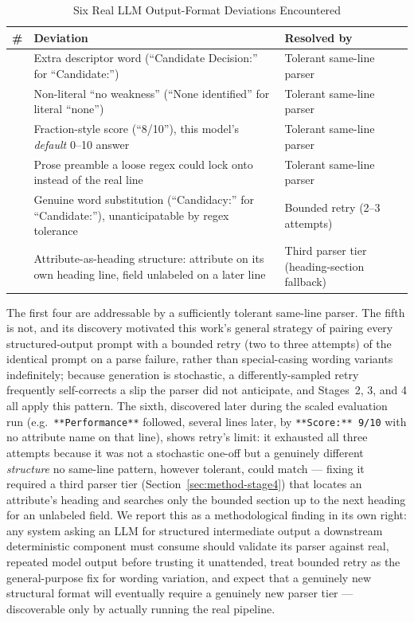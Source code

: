 \documentclass[lettersize,journal]{IEEEtran}
\begin{document}
\begin{table}[t]
\caption{Six Real LLM Output-Format Deviations Encountered\label{tab:deviations}}
\centering
\footnotesize
\setlength{\tabcolsep}{3pt}
\begin{tabular}{@{}
  >{\centering\arraybackslash}p{0.15in}
  >{\raggedright\arraybackslash}p{1.55in}
  >{\raggedright\arraybackslash}p{1.65in}
@{}}
\toprule
\# & Deviation & Resolved by \\
\midrule
1 & Extra descriptor word (``Candidate Decision:'' for ``Candidate:'') & Tolerant same-line parser \\
2 & Non-literal ``no weakness'' (``None identified'' for literal ``none'') & Tolerant same-line parser \\
3 & Fraction-style score (``8/10''), this model's \emph{default} 0--10 answer & Tolerant same-line parser \\
4 & Prose preamble a loose regex could lock onto instead of the real line & Tolerant same-line parser \\
5 & Genuine word substitution (``Candidacy:'' for ``Candidate:''), unanticipatable by regex tolerance & Bounded retry (2--3 attempts) \\
6 & Attribute-as-heading structure: attribute on its own heading line, field unlabeled on a later line & Third parser tier (heading-section fallback) \\
\bottomrule
\end{tabular}
\end{table}

The first four are addressable by a sufficiently tolerant same-line parser. The fifth is not, and its discovery motivated this work's general strategy of pairing every structured-output prompt with a bounded retry (two to three attempts) of the identical prompt on a parse failure, rather than special-casing wording variants indefinitely; because generation is stochastic, a differently-sampled retry frequently self-corrects a slip the parser did not anticipate, and Stages~2, 3, and 4 all apply this pattern. The sixth, discovered later during the scaled evaluation run (e.g.\ \texttt{**Performance**} followed, several lines later, by \texttt{**Score:** 9/10} with no attribute name on that line), shows retry's limit: it exhausted all three attempts because it was not a stochastic one-off but a genuinely different \emph{structure} no same-line pattern, however tolerant, could match --- fixing it required a third parser tier (Section~\ref{sec:method-stage4}) that locates an attribute's heading and searches only the bounded section up to the next heading for an unlabeled field. We report this as a methodological finding in its own right: any system asking an LLM for structured intermediate output a downstream deterministic component must consume should validate its parser against real, repeated model output before trusting it unattended, treat bounded retry as the general-purpose fix for wording variation, and expect that a genuinely new structural format will eventually require a genuinely new parser tier --- discoverable only by actually running the real pipeline.
\end{document}
